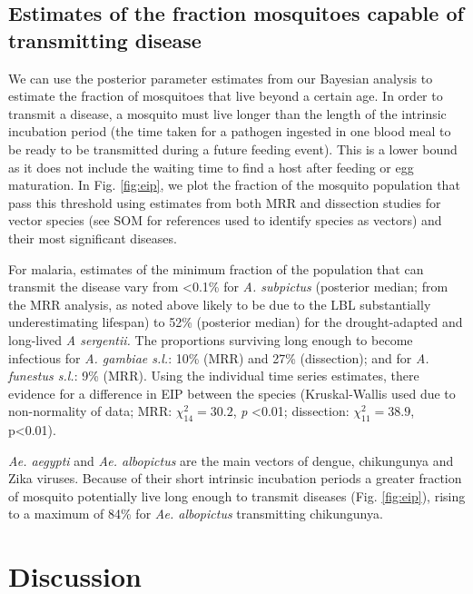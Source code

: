 \documentclass[]{article}
\begin{document}
\subsection{Estimates of the fraction mosquitoes capable of transmitting
disease}\label{estimates-of-the-fraction-mosquitoes-capable-of-transmitting-disease}

We can use the posterior parameter estimates from our Bayesian analysis
to estimate the fraction of mosquitoes that live beyond a certain age.
In order to transmit a disease, a mosquito must live longer than the
length of the intrinsic incubation period (the time taken for a pathogen
ingested in one blood meal to be ready to be transmitted during a future
feeding event). This is a lower bound as it does not include the waiting
time to find a host after feeding or egg maturation. In Fig. \ref{fig:eip}, we plot
the fraction of the mosquito population that pass this threshold using
estimates from both MRR and dissection studies for vector species (see
SOM for references used to identify species as vectors) and their most
significant diseases.

For malaria, estimates of the minimum fraction of the population that
can transmit the disease vary from \textless{}0.1\% for \emph{A.
subpictus} (posterior median; from the MRR analysis, as noted above likely to be due to
the LBL substantially underestimating lifespan) to 52\% (posterior median) for the
drought-adapted and long-lived \emph{A sergentii.} The proportions
surviving long enough to become infectious for \emph{A. gambiae s.l.}: 10\% (MRR) and 27\%
(dissection); and for \emph{A. funestus s.l.}: 9\% (MRR). Using the
individual time series estimates, there
evidence for a difference in EIP between the species (Kruskal-Wallis used due to non-normality of data; MRR:
\(\chi_{14}^{2} = 30.2\), \emph{p} \textless{}0.01; dissection: \(\chi_{11}^{2} = 38.9\), p\textless{}0.01).

\emph{Ae. aegypti} and \emph{Ae. albopictus} are the main vectors of
dengue, chikungunya and Zika viruses. Because of their short intrinsic
incubation periods a greater fraction of mosquito potentially live long
enough to transmit diseases (Fig. \ref{fig:eip}), rising to a maximum of 84\% for
\emph{Ae. albopictus} transmitting chikungunya.

\section{Discussion}\label{discussion}
\end{document}
